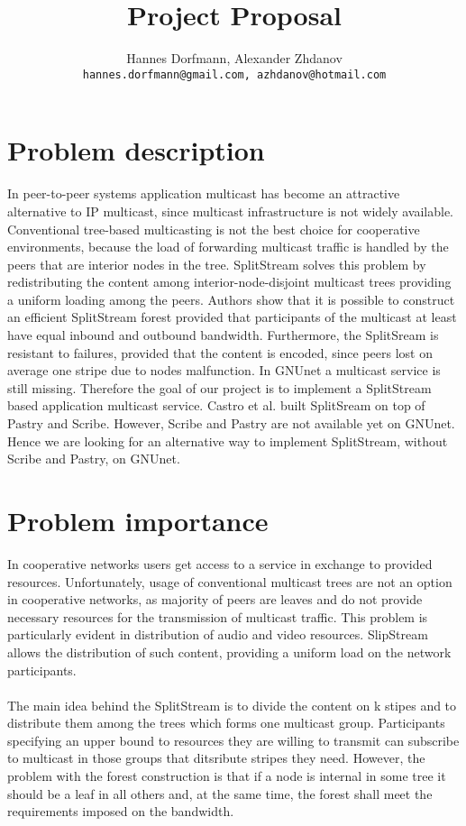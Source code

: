 \documentclass[a4paper,10pt]{article}
\title{Project Proposal}
\author{Hannes Dorfmann, Alexander Zhdanov \\
  \texttt{hannes.dorfmann@gmail.com, azhdanov@hotmail.com}}
\begin{document}
\maketitle

\section{Problem description}
In peer-to-peer systems application multicast has become an attractive alternative to IP multicast, since multicast infrastructure is not widely available. Conventional tree-based multicasting is not the best choice for cooperative environments, because the load of forwarding multicast traffic is handled by the peers that are interior nodes in the tree. SplitStream \cite{castro1} solves this problem by redistributing the content among interior-node-disjoint
multicast trees providing a uniform loading among the peers. Authors \cite{castro1} show that it is possible
to construct an efficient SplitStream forest provided that participants of the multicast at least have equal
inbound and outbound bandwidth. Furthermore, the SplitSream is resistant to failures, provided that the content is encoded, since peers lost on average one stripe due to nodes malfunction.
In GNUnet a multicast service is still missing. Therefore the goal of our project is to implement a SplitStream based application multicast service. Castro et al. \cite{castro1} built SplitSream  on top of Pastry and Scribe. However, Scribe \cite{castro3} and Pastry \cite{Rowstron} are not available yet on GNUnet. Hence we are looking for an alternative way to implement SplitStream, without Scribe and Pastry, on GNUnet.


\section{Problem importance}
In cooperative networks users get access to a service in exchange
to provided resources. Unfortunately, usage of conventional multicast trees are not an option in cooperative networks, as majority of
peers are leaves and do not provide necessary resources for the transmission of multicast traffic. This problem is particularly
evident in distribution of audio and video resources. SlipStream allows the distribution of such content, providing a
uniform load on the network participants.
\paragraph{}
The main idea behind the SplitStream is to divide the content on k stipes and to distribute them among the trees which forms
one multicast group. Participants specifying an upper bound to resources they are willing to transmit can subscribe to
multicast in those groups that ditsribute stripes they need. However, the problem with the forest construction is that if
a node is internal in some tree it should be a leaf in all others and, at the same time, the forest shall meet the
requirements imposed on the bandwidth.
\end{document}
